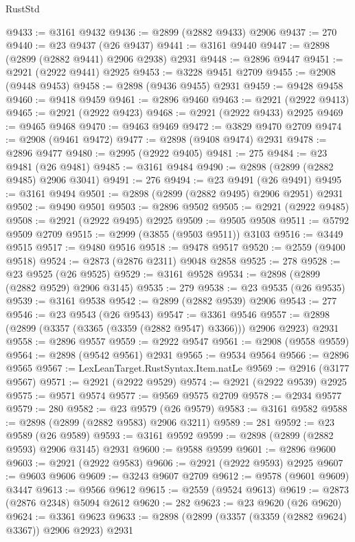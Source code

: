 \begin{lexlean}{RustStd}
\begin{coremodule}
@9433 := @3161 @9432
@9436 := @2899 (@2882 @9433) @2906
@9437 := 270
@9440 := @23 @9437 (@26 @9437)
@9441 := @3161 @9440
@9447 := @2898 (@2899 (@2882 @9441) @2906 @2938) @2931
@9448 := @2896 @9447
@9451 := @2921 (@2922 @9441) @2925
@9453 := @3228 @9451 @2709
@9455 := @2908 (@9448 @9453)
@9458 := @2898 (@9436 @9455) @2931
@9459 := @9428 @9458
@9460 := @9418 @9459
@9461 := @2896 @9460
@9463 := @2921 (@2922 @9413)
@9465 := @2921 (@2922 @9423)
@9468 := @2921 (@2922 @9433) @2925
@9469 := @9465 @9468
@9470 := @9463 @9469
@9472 := @3829 @9470 @2709
@9474 := @2908 (@9461 @9472)
@9477 := @2898 (@9408 @9474) @2931
@9478 := @2896 @9477
@9480 := @2995 (@2922 @9405)
@9481 := 275
@9484 := @23 @9481 (@26 @9481)
@9485 := @3161 @9484
@9490 := @2898 (@2899 (@2882 @9485) @2906 @3041)
@9491 := 276
@9494 := @23 @9491 (@26 @9491)
@9495 := @3161 @9494
@9501 := @2898 (@2899 (@2882 @9495) @2906 @2951) @2931
@9502 := @9490 @9501
@9503 := @2896 @9502
@9505 := @2921 (@2922 @9485)
@9508 := @2921 (@2922 @9495) @2925
@9509 := @9505 @9508
@9511 := @5792 @9509 @2709
@9515 := @2999 (@3855 (@9503 @9511)) @3103
@9516 := @3449 @9515
@9517 := @9480 @9516
@9518 := @9478 @9517
@9520 := @2559 (@9400 @9518)
@9524 := @2873 (@2876 @2311) @9048 @2858
@9525 := 278
@9528 := @23 @9525 (@26 @9525)
@9529 := @3161 @9528
@9534 := @2898 (@2899 (@2882 @9529) @2906 @3145)
@9535 := 279
@9538 := @23 @9535 (@26 @9535)
@9539 := @3161 @9538
@9542 := @2899 (@2882 @9539) @2906
@9543 := 277
@9546 := @23 @9543 (@26 @9543)
@9547 := @3361 @9546
@9557 := @2898 (@2899 (@3357 (@3365 (@3359 (@2882 @9547) @3366))) @2906 @2923) @2931
@9558 := @2896 @9557
@9559 := @2922 @9547
@9561 := @2908 (@9558 @9559)
@9564 := @2898 (@9542 @9561) @2931
@9565 := @9534 @9564
@9566 := @2896 @9565
@9567 := LexLeanTarget.RustSyntax.Item.natLe
@9569 := @2916 (@3177 @9567)
@9571 := @2921 (@2922 @9529)
@9574 := @2921 (@2922 @9539) @2925
@9575 := @9571 @9574
@9577 := @9569 @9575 @2709
@9578 := @2934 @9577
@9579 := 280
@9582 := @23 @9579 (@26 @9579)
@9583 := @3161 @9582
@9588 := @2898 (@2899 (@2882 @9583) @2906 @3211)
@9589 := 281
@9592 := @23 @9589 (@26 @9589)
@9593 := @3161 @9592
@9599 := @2898 (@2899 (@2882 @9593) @2906 @3145) @2931
@9600 := @9588 @9599
@9601 := @2896 @9600
@9603 := @2921 (@2922 @9583)
@9606 := @2921 (@2922 @9593) @2925
@9607 := @9603 @9606
@9609 := @3243 @9607 @2709
@9612 := @9578 (@9601 @9609) @3447
@9613 := @9566 @9612
@9615 := @2559 (@9524 @9613)
@9619 := @2873 (@2876 @2348) @5094 @2612
@9620 := 282
@9623 := @23 @9620 (@26 @9620)
@9624 := @3361 @9623
@9633 := @2898 (@2899 (@3357 (@3359 (@2882 @9624) @3367)) @2906 @2923) @2931

\end{coremodule}
\end{lexlean}
